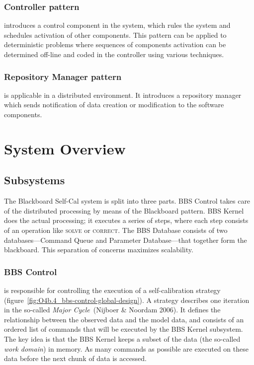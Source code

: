\documentclass[11pt,twoside]{article}  %
\begin{document}
\subsubsection{Controller pattern} introduces a control component in the
system, which rules the system and schedules activation of other
components. This pattern can be applied to deterministic problems where
sequences of components activation can be determined off-line and coded in the
controller using various techniques.
\subsubsection{Repository Manager pattern} is applicable in a distributed
environment. It introduces a repository manager which sends notification of
data creation or modification to the software components.

\section{System Overview}
\subsection{Subsystems}
The Blackboard Self-Cal system is split into three parts. BBS Control takes
care of the distributed processing by means of the Blackboard pattern. BBS
Kernel does the actual processing; it executes a series of steps, where each
step consists of an operation like \textsc{solve} or \textsc{correct}. The BBS
Database consists of two databases---Command Queue and Parameter
Database---that together form the blackboard. This separation of concerns
maximizes scalability. 

\subsubsection{BBS Control} is responsible for controlling the execution of a
self-calibration strategy
(figure~\ref{fig:O4b.4_bbs-control-global-design}). A strategy describes one
iteration in the so-called \emph{Major Cycle}~(Nijboer \& Noordam 2006). It
defines the relationship between the observed data and the model data, and
consists of an ordered list of commands that will be executed by the BBS
Kernel subsystem. The key idea is that the BBS Kernel keeps a subset of the
data (the so-called \emph{work domain}) in memory. As many commands as
possible are executed on these data before the next chunk of data is accessed.
\end{document}
